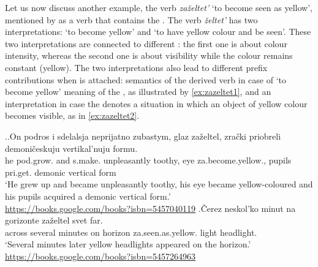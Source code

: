 Let us now discuss another example, the verb \textit{za\v{z}eltet'} `to become seen as yellow', mentioned by \citet{Braginsky:08} as a verb that contains the  \mbox{.} The verb \textit{\v{z}eltet'} has two interpretations: `to become yellow' and `to have yellow colour and be seen'. These two interpretations are connected to different  : the first one is about colour intensity, whereas the second one is about visibility while the colour remains constant (yellow). The two interpretations also lead to different prefix contributions when  is attached:  semantics of the derived verb in case of `to become yellow' meaning of the , as illustrated by \ref{ex:zazeltet1}, and an  interpretation in case the  denotes a  situation in which an object of yellow colour becomes visible, as in \ref{ex:zazeltet2}.


\ex.\label{ex:zazeltet}\ag.\label{ex:zazeltet1}On podros i sdelalsja neprijatno zubastym, glaz za\v{z}eltel, zra\v{c}ki priobreli demoni\v{c}eskuju vertikal'nuju formu.\\
he pod.grow. and s.make. unpleasantly toothy, eye za.become.yellow., pupils pri.get. demonic vertical form\\
`He grew up and became unpleasantly toothy, his eye became yellow-coloured and his pupils acquired a demonic vertical form.'\\\hbox{}\hfill\hbox{\url{https://books.google.com/books?isbn=5457040119}}
\bg.\label{ex:zazeltet2}\v{C}erez neskol'ko minut na gorizonte za\v{z}eltel svet far.\\
across several minutes on horizon za.seen.as.yellow. light headlight.\\
`Several minutes later yellow headlights appeared on the horizon.'\\\hbox{}\hfill\hbox{\url{https://books.google.com/books?isbn=5457264963}}

